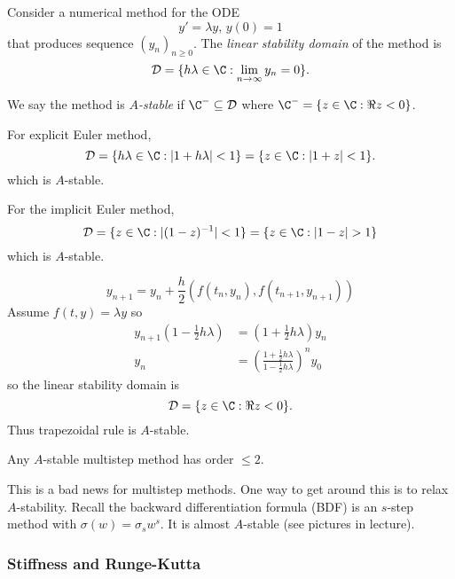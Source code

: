 \documentclass[a4paper]{article}
\begin{document}
\begin{definition}
  Consider a numerical method for the ODE
  \[
    y' = \lambda y, \, y(0) = 1
  \]
  that produces sequence \((y_n)_{n \geq 0}\). The \emph{linear stability domain} of the method is
  \[
    \mathcal D = \{h\lambda \in \C: \lim_{n \to \infty} y_n = 0\}.
  \]
\end{definition}

\begin{definition}[\(A\)-stable]
  We say the method is \emph{\(A\)-stable} if \(\C^- \subseteq \mathcal D\) where \(\C^- = \{z \in \C: \Re z < 0\}\).
\end{definition}

\begin{eg}
  For explicit Euler method,
  \[
    \mathcal D = \{h\lambda \in \C: |1 + h\lambda| < 1\}
    = \{z \in \C: |1 + z| < 1\}.
  \]
  which is \(A\)-stable.
  
  For the implicit Euler method,
  \[
    \mathcal D
    = \{z \in \C: |(1 - z)^{-1}| < 1\}
    = \{z \in \C: |1 - z| > 1\}
  \]
  which is \(A\)-stable.
\end{eg}

\begin{eg}
  \[
    y_{n + 1} = y_n + \frac{h}{2}(f(t_n, y_n), f(t_{n + 1}, y_{n + 1}))
  \]
  Assume \(f(t, y) = \lambda y\) so
  \begin{align*}
    y_{n + 1}(1 - \frac{1}{2}h\lambda) &= (1 + \frac{1}{2}h\lambda)y_n \\
    y_n &= \left( \frac{1 + \frac{1}{2}h\lambda}{1 - \frac{1}{2}h\lambda} \right)^n y_0
  \end{align*}
  so the linear stability domain is
  \[
    \mathcal D = \{z \in \C: \Re z < 0\}.
  \]
  Thus trapezoidal rule is \(A\)-stable.
\end{eg}

\begin{theorem}
  Any \(A\)-stable multistep method has order \(\leq 2\).
\end{theorem}

This is a bad news for multistep methods. One way to get around this is to relax \(A\)-stability. Recall the backward differentiation formula (BDF) is an \(s\)-step method with \(\sigma(w) = \sigma_sw^s\). It is almost \(A\)-stable (see pictures in lecture).

\subsubsection{Stiffness and Runge-Kutta}
\end{document}
